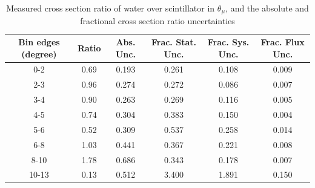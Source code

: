 \documentclass[../main.tex]{subfiles}
\begin{document}
\begin{table}
  \centering
  \renewcommand{\arraystretch}{1.15}
  \caption{Systematic covariance matrix of measured cross section ratio of water over scintillator in $p_{\mu}$}
  \label{tbl:rationucleonnuc10muon_pc}
\end{table}
\begin{table}
  \centering
  \renewcommand{\arraystretch}{1.15}
  \caption{Measured cross section ratio of water over scintillator in $\theta_{\mu}$, and the absolute and fractional cross section ratio uncertainties}
    \begin{tabular}{c||c|c||c|c|c}
      Bin edges (degree) &  Ratio  &  Abs. Unc.  &  Frac. Stat. Unc.  &  Frac. Sys. Unc.  &  Frac. Flux Unc. \\
      \hline
      \hline
      0-2 & 0.69 & 0.193 & 0.261 & 0.108 & 0.009\\
      2-3 & 0.96 & 0.274 & 0.272 & 0.086 & 0.007\\
      3-4 & 0.90 & 0.263 & 0.269 & 0.116 & 0.005\\
      4-5 & 0.74 & 0.304 & 0.383 & 0.150 & 0.004\\
      5-6 & 0.52 & 0.309 & 0.537 & 0.258 & 0.014\\
      6-8 & 1.03 & 0.441 & 0.367 & 0.221 & 0.008\\
      8-10 & 1.78 & 0.686 & 0.343 & 0.178 & 0.007\\
      10-13 & 0.13 & 0.512 & 3.400 & 1.891 & 0.150
    \end{tabular}
  \label{tbl:rationucleonnuc10muon_thetaa}
\end{table}
\end{document}
